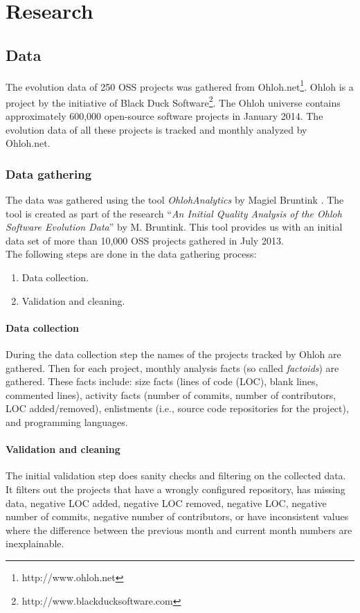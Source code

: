 \chapter{Research}
\label{research}

\section{Data}
The evolution data of 250 OSS projects was gathered from
Ohloh.net\footnote{http://www.ohloh.net}. Ohloh is a project by the initiative
of Black Duck Software\footnote{http://www.blackducksoftware.com}. The Ohloh
universe contains approximately 600,000 open-source software projects in
January 2014. The evolution data of all these projects is tracked and monthly
analyzed by Ohloh.net.

\subsection{Data gathering}
The data was gathered using the tool \emph{OhlohAnalytics }\rm by Magiel
Bruntink \cite{ohlohanalytics}. The tool is created as part of the research
``\emph{An Initial Quality Analysis of the Ohloh Software Evolution Data}\rm''
by M. Bruntink. This tool provides us with an initial data set of more than
10,000 OSS projects gathered in July 2013.\\

\noindent	
The following steps are done in the data gathering process:
\begin{enumerate}
	\item Data collection.
	\item Validation and cleaning.
\end{enumerate}

\subsubsection{Data collection}
During the data collection step the names of the projects tracked by Ohloh are
gathered. Then for each project, monthly analysis facts (so called
\emph{factoids}\rm) are gathered. These facts include: size facts (lines of code
(LOC), blank lines, commented lines), activity facts (number of commits, number
of contributors, LOC added/removed), enlistments (i.e., source code
repositories for the project), and programming languages.

\subsubsection{Validation and cleaning}
The initial validation step does sanity checks and filtering on the collected
data. It filters out the projects that have a wrongly configured repository,
has missing data, negative LOC added, negative LOC removed, negative LOC,
negative number of commits, negative number of contributors, or have
inconsistent values where the difference between the previous month and current
month numbers are inexplainable.\\

